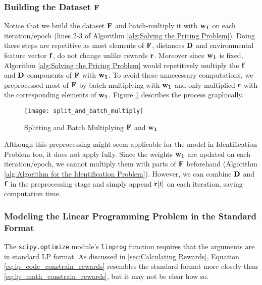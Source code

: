 \begin{appendices}
    \subsubsection{Building the Dataset $\mathbf{F}$}
    Notice that we build the dataset $\mathbf{F}$ and batch-multiply it with $\mathbf{w_1}$ on each iteration/epoch (lines 2-3 of Algorithm \ref{alg:Solving the Pricing Problem}). Doing these steps are repetitive as most elements of $\mathbf{F}$, distances $\mathbf{D}$ and environmental feature vector $\mathbf{f}$, do not change unlike rewards $\mathbf{r}$. Moreover since $\mathbf{w_1}$ is fixed, Algorithm \ref{alg:Solving the Pricing Problem} would repetitively multiply the $\mathbf{f}$ and $\mathbf{D}$ components of $\mathbf{F}$ with $\mathbf{w_1}$. To avoid these unnecessary computations, we preprocessed most of $\mathbf{F}$ by batch-multiplying with $\mathbf{w_1}$ and only multiplied $\mathbf{r}$ with the corresponding elements of $\mathbf{w_1}$. Figure \ref{fig:Splitting and Batch Multiplying F and w1} describes the process graphically.\\
    \begin{figure}[!htbp]
        \centering
        \texttt{[image: split\_and\_batch\_multiply]}
        \caption{Splitting and Batch Multiplying $\mathbf{F}$ and $\mathbf{w_1}$}
        \label{fig:Splitting and Batch Multiplying F and w1}
    \end{figure}    
    Although this preprocessing might seem applicable for the model in Identification Problem too, it does not apply fully. Since the weights $\mathbf{w_1}$ are updated on each iteration/epoch, we cannot multiply them with parts of $\mathbf{F}$ beforehand (Algorithm \ref{alg:Algorithm for the Identification Problem}). However, we can combine $\mathbf{D}$ and $\mathbf{f}$ in the preprocessing stage and simply append $\mathbf{r}[t]$ on each iteration, saving computation time.
    
    \subsubsection{Modeling the Linear Programming Problem in the Standard Format}
    The \texttt{scipy.optimize} module's \texttt{linprog} function requires that the arguments are in standard LP format. As discussed in \cref{sec:Calculating Rewards}, Equation \ref{eq:lp_code_constrain_rewards} resembles the standard format more closely than \ref{eq:lp_math_constrain_rewards}, but it may not be clear how so.\\
    

\end{appendices}
